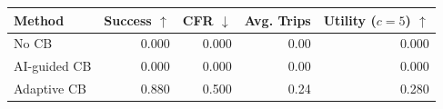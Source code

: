 \begin{tabular}{lrrrr}
\toprule
Method & Success $\uparrow$ & CFR $\downarrow$ & Avg. Trips & Utility ($c=5$) $\uparrow$ \\
\midrule
No CB & 0.000 & 0.000 & 0.00 & 0.000 \\
AI-guided CB & 0.000 & 0.000 & 0.00 & 0.000 \\
Adaptive CB & 0.880 & 0.500 & 0.24 & 0.280 \\
\bottomrule
\end{tabular}
